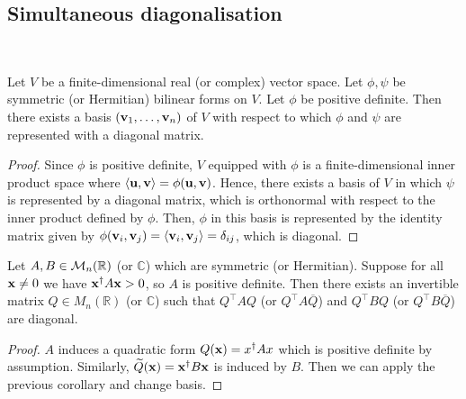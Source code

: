 \documentclass[a4paper,11pt]{article}
\begin{document}
\subsection{Simultaneous diagonalisation}
\ \vspace*{-1.5em}
\begin{corollary}
	Let \( V \) be a finite-dimensional real (or complex) vector space.
	Let \( \phi, \psi \) be symmetric (or Hermitian) bilinear forms on \( V \).
	Let \( \phi \) be positive definite.
	Then there exists a basis \( ({\bf v}_1, \dots, {\bf v}_n) \) of \( V \) with respect to which \( \phi \) and \( \psi \) are represented with a diagonal matrix.
\end{corollary}
\begin{proof}
	Since \( \phi \) is positive definite, \( V \) equipped with \( \phi \) is a finite-dimensional inner product space where \( \left\langle{{\bf u},{\bf v}}\right\rangle = \phi({\bf u},{\bf v}) \).
	Hence, there exists a basis of \( V \) in which \( \psi \) is represented by a diagonal matrix, which is orthonormal with respect to the inner product defined by \( \phi \).
	Then, \( \phi \) in this basis is represented by the identity matrix given by \( \phi({\bf v}_i, {\bf v}_j) = \left\langle{{\bf v}_i, {\bf v}_j}\right\rangle = \delta_{ij} \), which is diagonal.
\end{proof}
\begin{corollary}
	Let \( A, B \in {\mathcal{M}}_n(\mathbb R) \) (or \( \mathbb C \)) which are symmetric (or Hermitian).
	Suppose for all \( {\bf x} \neq 0 \) we have \( {\bf x}^\dagger A {\bf x} > 0 \), so \( A \) is positive definite.
	Then there exists an invertible matrix \( Q \in M_n(\mathbb R) \) (or \( \mathbb C \)) such that \( Q^\top A Q \) (or \( Q^\top A \overline{Q} \)) and \( Q^\top B Q \) (or \( Q^\top B \overline{Q} \)) are diagonal.
\end{corollary}
\begin{proof}
	\( A \) induces a quadratic form \( Q({\bf x}) = x^\dagger A x \) which is positive definite by assumption.
	Similarly, \( \widetilde Q({\bf x}) = {\bf x}^\dagger B {\bf x} \) is induced by \( B \).
	Then we can apply the previous corollary and change basis.
\end{proof}
\end{document}

